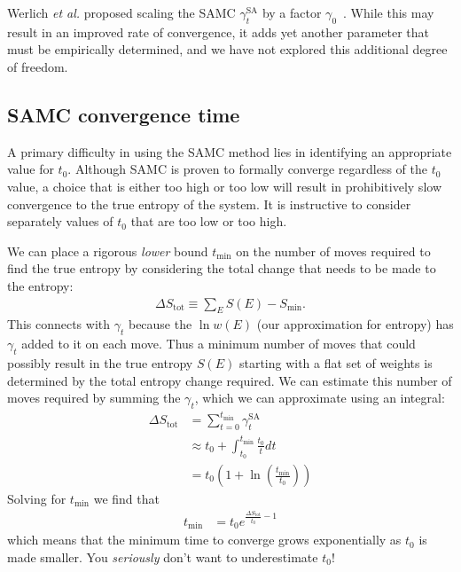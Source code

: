 \documentclass[letterpaper,twocolumn,amsmath,amssymb,pre,aps,10pt]{revtex4-1}
\begin{document}
Werlich \emph{et al.} proposed scaling the SAMC $\gamma_t^{\text{SA}}$
by a factor $\gamma_0$~\cite{werlich2015stochastic}.  While this may result in
an improved rate of convergence, it adds yet another parameter that must be
empirically determined, and we have not explored this additional degree of
freedom.

\subsection{SAMC convergence time}\label{sec:samc-convergence}
A primary difficulty in using the SAMC method lies in identifying an
appropriate value for $t_0$.  Although SAMC is proven to formally
converge regardless of the $t_0$ value, a choice that is either too
high or too low will result in prohibitively slow convergence to the true
entropy of the system.  It is instructive to consider separately
values of $t_0$ that are too low or too high.

We can place a rigorous \emph{lower} bound $t_{\min}$ on the number of
moves required to find the true entropy by considering the total change
that needs to be made to the entropy:
\begin{align}
  \Delta S_{\text{tot}} \equiv \sum_E S(E) - S_{\min}.
\end{align}
This connects with $\gamma_t$ because the $\ln w(E)$ (our approximation for entropy)
has $\gamma_t$ added to it on each move.  Thus a minimum number of moves
that could possibly result in the true entropy $S(E)$ starting with a flat set of
weights is determined by the total entropy change required.  We can estimate
this number of moves required by summing the $\gamma_t$,
which we can approximate using an integral:
\begin{align}
   \Delta S_{\text{tot}} &= \sum_{t=0}^{t_{\min}} \gamma_t^{\text{SA}} \\
  &\approx t_0 + \int_{t_0}^{t_{\min}} \frac{t_0}{t}dt
  \\
  &= t_0\left(1 + \ln\left(\frac{t_{\min}}{t_0}\right)\right)
\end{align}
Solving for ${t_{\min}}$ we find that
\begin{align}
  {t_{\min}} &= t_0 e^{\frac{\Delta S_{\text{tot}}}{t_0} - 1}
\end{align}
which means that the minimum time to converge grows exponentially
as $t_0$ is made smaller.  You \emph{seriously} don't want to underestimate
$t_0$!
\end{document}
